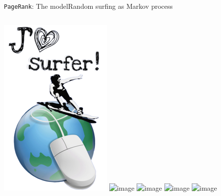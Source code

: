 \documentclass[xcolor=table,final]{beamer} %
\newcommand{\PageRank}{\texttt{PageRank}\xspace}
\begin{document}
\begin{frame}{\PageRank : The model}{Random surfing as Markov process}
  \begin{columns}
    \includegraphics[width=1.\textwidth]{figs/extras/web-surfer}
    \includegraphics<1>[width=1.\textwidth]{figs/tex/graph}
    \includegraphics<2>[width=1.\textwidth]{figs/tex/graph_probability0}
    \includegraphics<3>[width=1.\textwidth]{figs/tex/graph_probability1}
    \includegraphics<4>[width=1.\textwidth]{figs/tex/graph_probability2}
    

\end{columns}
\end{frame}
\end{document}
